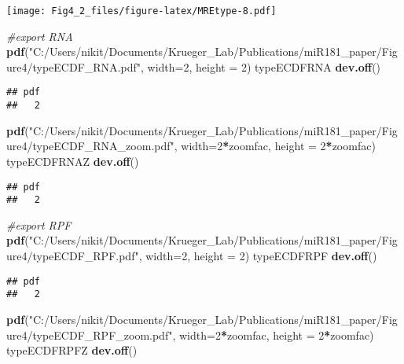 \documentclass[
]{article}
\newenvironment{Shaded}{\begin{snugshade}}{\end{snugshade}}
\newcommand{\AttributeTok}[1]{\textcolor[rgb]{0.13,0.29,0.53}{#1}}
\newcommand{\CommentTok}[1]{\textcolor[rgb]{0.56,0.35,0.01}{\textit{#1}}}
\newcommand{\DecValTok}[1]{\textcolor[rgb]{0.00,0.00,0.81}{#1}}
\newcommand{\FunctionTok}[1]{\textcolor[rgb]{0.13,0.29,0.53}{\textbf{#1}}}
\newcommand{\NormalTok}[1]{#1}
\newcommand{\SpecialCharTok}[1]{\textcolor[rgb]{0.81,0.36,0.00}{\textbf{#1}}}
\newcommand{\StringTok}[1]{\textcolor[rgb]{0.31,0.60,0.02}{#1}}
\begin{document}
\texttt{[image: Fig4\_2\_files/figure-latex/MREtype-8.pdf]}

\begin{Shaded}
\begin{Highlighting}[]
\CommentTok{\#export RNA}
\FunctionTok{pdf}\NormalTok{(}\StringTok{"C:/Users/nikit/Documents/Krueger\_Lab/Publications/miR181\_paper/Figure4/typeECDF\_RNA.pdf"}\NormalTok{, }\AttributeTok{width=}\DecValTok{2}\NormalTok{, }\AttributeTok{height =} \DecValTok{2}\NormalTok{)}
\NormalTok{typeECDFRNA}
\FunctionTok{dev.off}\NormalTok{()}
\end{Highlighting}
\end{Shaded}

\begin{verbatim}
## pdf 
##   2
\end{verbatim}

\begin{Shaded}
\begin{Highlighting}[]
\FunctionTok{pdf}\NormalTok{(}\StringTok{"C:/Users/nikit/Documents/Krueger\_Lab/Publications/miR181\_paper/Figure4/typeECDF\_RNA\_zoom.pdf"}\NormalTok{, }\AttributeTok{width=}\DecValTok{2}\SpecialCharTok{*}\NormalTok{zoomfac, }\AttributeTok{height =} \DecValTok{2}\SpecialCharTok{*}\NormalTok{zoomfac)}
\NormalTok{typeECDFRNAZ}
\FunctionTok{dev.off}\NormalTok{()}
\end{Highlighting}
\end{Shaded}

\begin{verbatim}
## pdf 
##   2
\end{verbatim}

\begin{Shaded}
\begin{Highlighting}[]
\CommentTok{\#export RPF}
\FunctionTok{pdf}\NormalTok{(}\StringTok{"C:/Users/nikit/Documents/Krueger\_Lab/Publications/miR181\_paper/Figure4/typeECDF\_RPF.pdf"}\NormalTok{, }\AttributeTok{width=}\DecValTok{2}\NormalTok{, }\AttributeTok{height =} \DecValTok{2}\NormalTok{)}
\NormalTok{typeECDFRPF}
\FunctionTok{dev.off}\NormalTok{()}
\end{Highlighting}
\end{Shaded}

\begin{verbatim}
## pdf 
##   2
\end{verbatim}

\begin{Shaded}
\begin{Highlighting}[]
\FunctionTok{pdf}\NormalTok{(}\StringTok{"C:/Users/nikit/Documents/Krueger\_Lab/Publications/miR181\_paper/Figure4/typeECDF\_RPF\_zoom.pdf"}\NormalTok{, }\AttributeTok{width=}\DecValTok{2}\SpecialCharTok{*}\NormalTok{zoomfac, }\AttributeTok{height =} \DecValTok{2}\SpecialCharTok{*}\NormalTok{zoomfac)}
\NormalTok{typeECDFRPFZ}
\FunctionTok{dev.off}\NormalTok{()}
\end{Highlighting}
\end{Shaded}
\end{document}
